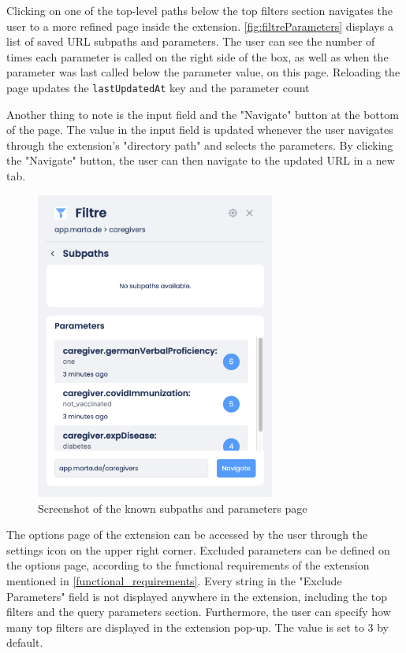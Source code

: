 Clicking on one of the top-level paths below the top filters section navigates the user to a more refined page inside the extension. \autoref{fig:filtreParameters} displays a list of saved URL subpaths and parameters. The user can see the number of times each parameter is called on the right side of the box, as well as when the parameter was last called below the parameter value, on this page. Reloading the page updates the \texttt{lastUpdatedAt} key and the parameter count

Another thing to note is the input field and the "Navigate" button at the bottom of the page. The value in the input field is updated whenever the user navigates through the extension's "directory path" and selects the parameters. By clicking the "Navigate" button, the user can then navigate to the updated URL in a new tab.

\begin{figure}[H]
  \centering
  \includegraphics[width=0.7\textwidth]{assets/screenshot_filtre_parameters.png}
  \caption{Screenshot of the known subpaths and parameters page}
  \label{fig:filtreParameters}
\end{figure}

The options page of the extension can be accessed by the user through the settings icon on the upper right corner. Excluded parameters can be defined on the options page, according to the functional requirements of the extension mentioned in \autoref{functional_requirements}. Every string in the "Exclude Parameters" field is not displayed anywhere in the extension, including the top filters and the query parameters section. Furthermore, the user can specify how many top filters are displayed in the extension pop-up. The value is set to 3 by default.

